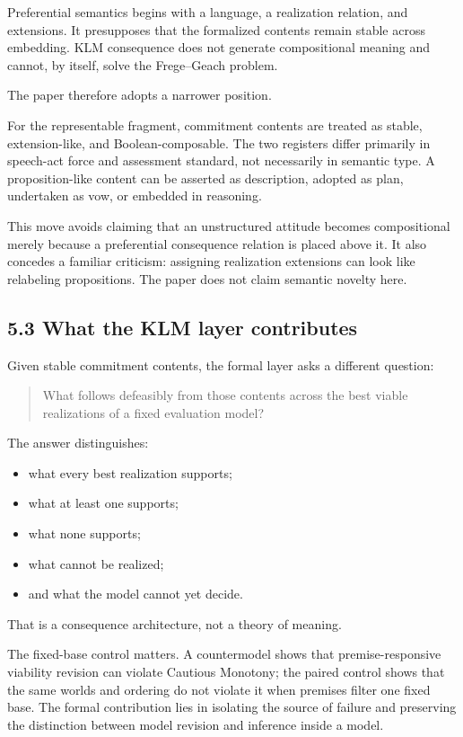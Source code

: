 \documentclass[
  11pt,
]{article}
\providecommand{\tightlist}{%
  \setlength{\itemsep}{0pt}\setlength{\parskip}{0pt}}
\begin{document}
Preferential semantics begins with a language, a realization relation,
and extensions. It presupposes that the formalized contents remain
stable across embedding. KLM consequence does not generate compositional
meaning and cannot, by itself, solve the Frege--Geach problem.

The paper therefore adopts a narrower position.

For the representable fragment, commitment contents are treated as
stable, extension-like, and Boolean-composable. The two registers differ
primarily in speech-act force and assessment standard, not necessarily
in semantic type. A proposition-like content can be asserted as
description, adopted as plan, undertaken as vow, or embedded in
reasoning.

This move avoids claiming that an unstructured attitude becomes
compositional merely because a preferential consequence relation is
placed above it. It also concedes a familiar criticism: assigning
realization extensions can look like relabeling propositions. The paper
does not claim semantic novelty here.

\subsection{5.3 What the KLM layer
contributes}\label{what-the-klm-layer-contributes}

Given stable commitment contents, the formal layer asks a different
question:

\begin{quote}
What follows defeasibly from those contents across the best viable
realizations of a fixed evaluation model?
\end{quote}

The answer distinguishes:

\begin{itemize}
\tightlist
\item
  what every best realization supports;
\item
  what at least one supports;
\item
  what none supports;
\item
  what cannot be realized;
\item
  and what the model cannot yet decide.
\end{itemize}

That is a consequence architecture, not a theory of meaning.

The fixed-base control matters. A countermodel shows that
premise-responsive viability revision can violate Cautious Monotony; the
paired control shows that the same worlds and ordering do not violate it
when premises filter one fixed base. The formal contribution lies in
isolating the source of failure and preserving the distinction between
model revision and inference inside a model.
\end{document}
